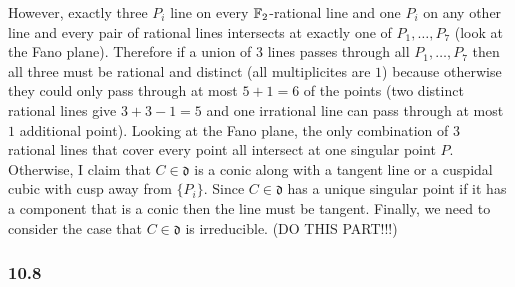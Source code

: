 \documentclass[12pt]{article}
\begin{document}
\begin{enumerate}
However, exactly three $P_i$ line on every $\mathbb{F}_2$-rational line and one $P_i$ on any other line and every pair of rational lines intersects at exactly one of $P_1, \dots, P_7$ (look at the Fano plane). Therefore if a union of 3 lines passes through all $P_1, \dots, P_7$ then all three must be rational and distinct (all multiplicites are $1$) because otherwise they could only pass through at most $5 + 1 = 6$ of the points (two distinct rational lines give $3 + 3 - 1 = 5$ and one irrational line can pass through at most $1$ additional point). Looking at the Fano plane, the only combination of $3$ rational lines that cover every point all intersect at one singular point $P$.
\bigskip\\
Otherwise, I claim that $C \in \mathfrak{d}$ is a conic along with a tangent line or a cuspidal cubic with cusp away from $\{ P_i \}$. Since $C \in \mathfrak{d}$ has a unique singular point if it has a component that is a conic then the line must be tangent. Finally, we need to consider the case that $C \in \mathfrak{d}$ is irreducible. (DO THIS PART!!!)
\end{enumerate}

\subsubsection{10.8}
\end{document}
